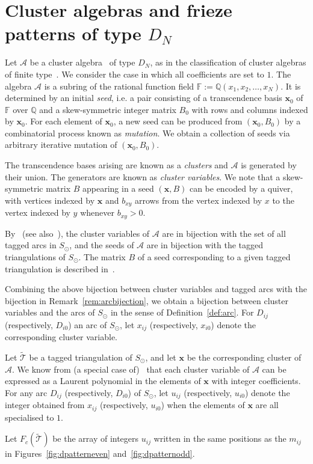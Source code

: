 \documentclass[a4paper]{amsart}
\begin{document}
\section{Cluster algebras and frieze patterns of type $D_N$}
\label{sec:clusteralgebras}

Let $\mathcal{A}$ be a cluster algebra~\cite{fominzelevinsky02} of type
$D_N$, as in the classification of cluster algebras of finite
type~\cite{fominzelevinsky03}. We consider the case in which all coefficients
are set to $1$. The algebra $\mathcal{A}$ is a subring of the rational
function field $\mathbb{F}:=\mathbb{Q}(x_1,x_2,\ldots ,x_N)$.
It is determined by an initial \emph{seed},
i.e. a pair consisting of a transcendence basis
$\mathbf{x}_0$ of $\mathbb{F}$ over $\mathbb{Q}$ and a
skew-symmetric integer matrix $B_0$ with rows and columns
indexed by $\mathbf{x}_0$. For each element of $\mathbf{x}_0$,
a new seed can be produced from $(\mathbf{x}_0,B_0)$ by a combinatorial
process known as \emph{mutation}. We obtain a collection of seeds via
arbitrary iterative mutation of $(\mathbf{x}_0,B_0)$.

The transcendence bases arising are known as a \emph{clusters} and
$\mathcal{A}$ is generated by their union. The generators are known as
\emph{cluster variables}. We note that a skew-symmetric matrix $B$
appearing in a seed $(\mathbf{x},B)$ can be encoded by a quiver,
with vertices indexed by $\mathbf{x}$ and $b_{xy}$ arrows from the
vertex indexed by $x$ to the vertex indexed by $y$ whenever $b_{xy}>0$.

By~\cite[7.11]{fst06} (see also~\cite{schiffler06}), the cluster variables of
$\mathcal{A}$ are in bijection with the set of all tagged arcs in $S_{\odot}$,
and the seeds of $\mathcal{A}$ are in bijection with the tagged
triangulations of $S_{\odot}$.
The matrix $B$ of a seed corresponding to a given tagged triangulation
is described in~\cite[9.6]{fst06}.

Combining the above bijection between cluster variables and tagged arcs
with the bijection in Remark~\ref{rem:arcbijection}, we obtain a
bijection between cluster variables and the arcs of $S_{\odot}$ in the sense of
Definition~\ref{def:arc}. For $D_{ij}$ (respectively, $D_{i0}$) an arc of
$S_{\odot}$, let $x_{ij}$ (respectively, $x_{i0}$) denote the corresponding
cluster variable.

\begin{definition}
Let $\widetilde{\mathcal T}$ be a tagged triangulation of $S_{\odot}$, and let
$\mathbf{x}$ be
the corresponding cluster of $\mathcal{A}$. We know
from (a special case of)~\cite[3.1]{fominzelevinsky01} that each cluster
variable of $\mathcal{A}$ can be expressed as a Laurent polynomial in the
elements of $\mathbf{x}$ with integer coefficients.
For any arc $D_{ij}$ (respectively, $D_{i0}$) of $S_{\odot}$, let
$u_{ij}$ (respectively, $u_{i0}$) denote the integer obtained
from $x_{ij}$ (respectively, $u_{i0}$) when the elements of $\mathbf{x}$
are all specialised to $1$.

Let $F_c(\widetilde{\mathcal T})$ be the array of integers $u_{ij}$ written in
the same positions as the $m_{ij}$ in Figures~\ref{fig:dpatterneven}
and~\ref{fig:dpatternodd}.
\end{definition}
\end{document}

